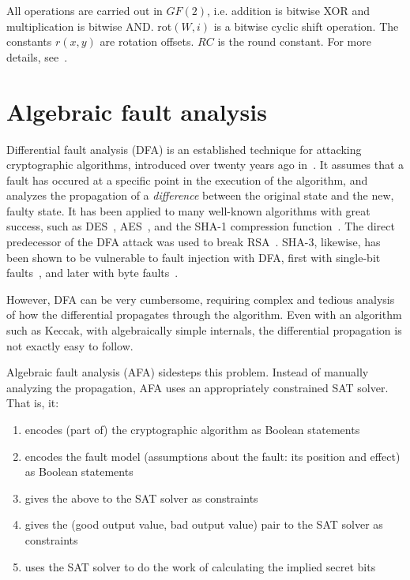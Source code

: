 \documentclass[times, utf8, diplomski]{fer}
\begin{document}
All operations are carried out in $GF(2)$, i.e. addition is bitwise XOR and
multiplication is bitwise AND. rot$(W,i)$ is a bitwise cyclic shift operation.
The constants $r(x,y)$ are rotation offsets. $RC$ is the round constant.
For more details, see~\cite{keccak_reference}.



\section{Algebraic fault analysis}
Differential fault analysis (DFA) is an established technique for attacking
cryptographic algorithms, introduced over twenty years ago in~\cite{DFA_DES}.
It assumes that a fault has occured at a specific point in the execution of the
algorithm, and analyzes the propagation of a \emph{difference} between the
original state and the new, faulty state. It has been applied to many well-known
algorithms with great success, such as DES~\cite{DFA_DES}, AES~\cite{DFA_AES, DFA_AES_single-fault},
and the SHA-1 compression function~\cite{DFA_SHA-1_compression}. The direct
predecessor of the DFA attack was used to break RSA~\cite{boneh-demillo-lipton_RSA}.
SHA-3, likewise, has been shown to be vulnerable to fault injection with DFA,
first with single-bit faults~\cite{DFA_SHA-3_single-bit}, and later with byte
faults~\cite{luo2017relaxed}.

However, DFA can be very cumbersome, requiring complex and tedious analysis of
how the differential propagates through the algorithm. Even with an algorithm
such as Keccak, with algebraically simple internals, the differential propagation
is not exactly easy to follow.\footnotemark


Algebraic fault analysis (AFA) sidesteps this problem. Instead of manually
analyzing the propagation, AFA uses an appropriately constrained SAT solver.
That is, it:
\begin{enumerate}
    \item encodes (part of) the cryptographic algorithm as Boolean statements
    \item encodes the fault model (assumptions about the fault: its position
          and effect) as Boolean statements
    \item gives the above to the SAT solver as constraints
    \item gives the (good output value, bad output value) pair to the SAT solver
          as constraints
    \item uses the SAT solver to do the work of calculating the implied secret
          bits
\end{enumerate}
\end{document}
